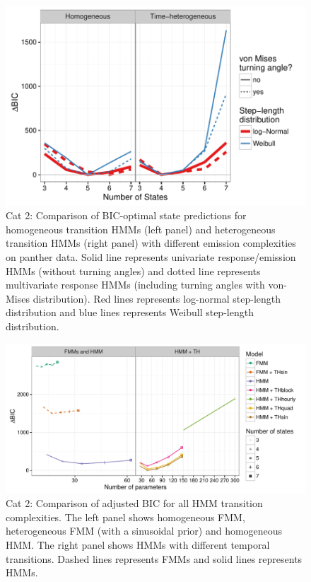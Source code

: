 \documentclass{article}\usepackage[]{graphicx}\usepackage{xcolor}
\makeatletter
\def\maxwidth{ %
  \ifdim\Gin@nat@width>\linewidth
    \linewidth
  \else
    \Gin@nat@width
  \fi
}
\newenvironment{knitrout}{}{} %
\makeatother
\begin{document}
\begin{knitrout}
\color{fgcolor}\begin{figure}
\includegraphics[width=\maxwidth]{figure/BICred_plot2-1} \caption{Cat 2: Comparison of BIC-optimal state predictions for homogeneous transition HMMs (left panel) and heterogeneous transition HMMs (right panel) with different emission complexities on panther data. Solid line represents univariate response/emission HMMs (without turning angles) and dotted line represents multivariate response HMMs (including turning angles with von-Mises distribution). Red lines represents log-normal step-length distribution and blue lines represents Weibull step-length distribution.}
\label{fig:BICred_plot2}
\end{figure}


\end{knitrout}

\clearpage
\begin{knitrout}
\color{fgcolor}\begin{figure}
\includegraphics[width=\maxwidth]{figure/adj_BIC_comparisons2-1} \caption{Cat 2: Comparison of adjusted BIC for all HMM transition complexities. The left panel shows homogeneous FMM, heterogeneous FMM (with a sinusoidal prior) and homogeneous HMM. The right panel shows HMMs with different temporal transitions. Dashed lines represents FMMs and solid lines represents HMMs.}\label{fig:adj_BIC_comparisons2}
\end{figure}


\end{knitrout}
\end{document}
